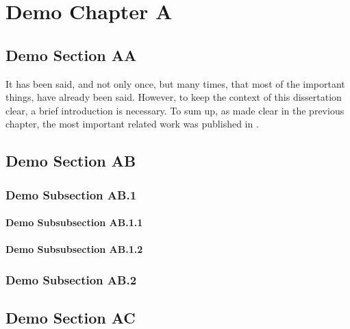

\chapter{Demo Chapter A}
\label{ch:ch2}

\lipsum[1-3]

\section{Demo Section AA}
\label{sec:ds2A}
It has been said, and not only once, but many times, that most of the important things, have already been said. However, to keep the context of this dissertation clear, a brief introduction is necessary. To sum up, as made clear in the previous chapter, the most important related work was published in \cite{demorefA:2000, demorefB:2001,demorefC:2002,demorefP:2003,demorefM:2004,demorefD:2005}.

\blindtext


\section{Demo Section AB}
\label{sec:ds2B}
\blindtext

\subsection{Demo Subsection AB.1}
\label{sub:dss2B1}
\blindmathpaper

\subsubsection{Demo Subsubsection AB.1.1}
\label{sub:dss2B11}
\blindtext

\subsubsection{Demo Subsubsection AB.1.2}
\label{sub:dss2B12}
\blindtext

\subsection{Demo Subsection AB.2}
\label{sub:dss2B2}
\blindmathpaper


\section{Demo Section AC}
\label{sec:ds2C}
\blindmathpaper
